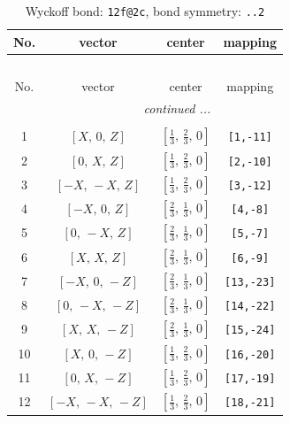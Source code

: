 \documentclass[fleqn,8pt]{jsarticle}
\begin{document}
\renewcommand{\arraystretch}{1.2}
\begin{longtable}{cccc}
\caption{Wyckoff bond: {\tt 12f@2c}, bond symmetry: {\tt ..2}}
 \\
 \hline \hline
No. & vector & center & mapping \\ \hline \endfirsthead

\multicolumn{3}{l}{\tablename\ \thetable{}} \\
 \hline \hline
No. & vector & center & mapping \\ \hline \endhead

 \hline \hline
\multicolumn{3}{r}{\footnotesize\it continued ...} \\ \endfoot

 \hline \hline
\multicolumn{3}{r}{} \\ \endlastfoot

1 & $\left[ X,\, 0,\, Z \right]$ & $\left[ \frac{1}{3},\, \frac{2}{3},\, 0 \right]$ & {\tt [1,-11]} \\ \hline
2 & $\left[ 0,\, X,\, Z \right]$ & $\left[ \frac{1}{3},\, \frac{2}{3},\, 0 \right]$ & {\tt [2,-10]} \\ \hline
3 & $\left[ - X,\, - X,\, Z \right]$ & $\left[ \frac{1}{3},\, \frac{2}{3},\, 0 \right]$ & {\tt [3,-12]} \\ \hline
4 & $\left[ - X,\, 0,\, Z \right]$ & $\left[ \frac{2}{3},\, \frac{1}{3},\, 0 \right]$ & {\tt [4,-8]} \\ \hline
5 & $\left[ 0,\, - X,\, Z \right]$ & $\left[ \frac{2}{3},\, \frac{1}{3},\, 0 \right]$ & {\tt [5,-7]} \\ \hline
6 & $\left[ X,\, X,\, Z \right]$ & $\left[ \frac{2}{3},\, \frac{1}{3},\, 0 \right]$ & {\tt [6,-9]} \\ \hline
7 & $\left[ - X,\, 0,\, - Z \right]$ & $\left[ \frac{2}{3},\, \frac{1}{3},\, 0 \right]$ & {\tt [13,-23]} \\ \hline
8 & $\left[ 0,\, - X,\, - Z \right]$ & $\left[ \frac{2}{3},\, \frac{1}{3},\, 0 \right]$ & {\tt [14,-22]} \\ \hline
9 & $\left[ X,\, X,\, - Z \right]$ & $\left[ \frac{2}{3},\, \frac{1}{3},\, 0 \right]$ & {\tt [15,-24]} \\ \hline
10 & $\left[ X,\, 0,\, - Z \right]$ & $\left[ \frac{1}{3},\, \frac{2}{3},\, 0 \right]$ & {\tt [16,-20]} \\ \hline
11 & $\left[ 0,\, X,\, - Z \right]$ & $\left[ \frac{1}{3},\, \frac{2}{3},\, 0 \right]$ & {\tt [17,-19]} \\ \hline
12 & $\left[ - X,\, - X,\, - Z \right]$ & $\left[ \frac{1}{3},\, \frac{2}{3},\, 0 \right]$ & {\tt [18,-21]} \\
\end{longtable}
\end{document}
